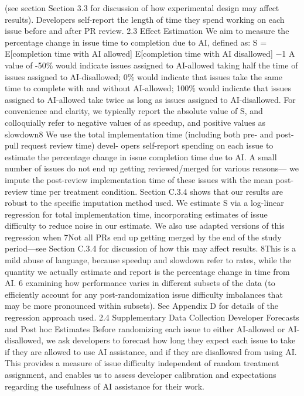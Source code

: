 (see section Section 3.3 for discussion of how experimental design may affect results). Developers
self-report the length of time they spend working on each issue before and after PR review.
2.3
Effect Estimation
We aim to measure the percentage change in issue time to completion due to AI, defined as:
S =
E[completion time with AI allowed]
E[completion time with AI disallowed] −1
A value of -50\% would indicate issues assigned to AI-allowed taking half the time of issues assigned
to AI-disallowed; 0\% would indicate that issues take the same time to complete with and without
AI-allowed; 100\% would indicate that issues assigned to AI-allowed take twice as long as issues
assigned to AI-disallowed. For convenience and clarity, we typically report the absolute value of S,
and colloquially refer to negative values of as speedup, and positive values as slowdown8
We use the total implementation time (including both pre- and post-pull request review time) devel-
opers self-report spending on each issue to estimate the percentage change in issue completion time
due to AI. A small number of issues do not end up getting reviewed/merged for various reasons—
we impute the post-review implementation time of these issues with the mean post-review time
per treatment condition. Section C.3.4 shows that our results are robust to the specific imputation
method used.
We estimate S via a log-linear regression for total implementation time, incorporating estimates of
issue difficulty to reduce noise in our estimate. We also use adapted versions of this regression when
7Not all PRs end up getting merged by the end of the study period—see Section C.3.4 for discussion of how
this may affect results.
8This is a mild abuse of language, because speedup and slowdown refer to rates, while the quantity we
actually estimate and report is the percentage change in time from AI.
6
examining how performance varies in different subsets of the data (to efficiently account for any
post-randomization issue difficulty imbalances that may be more pronounced within subsets). See
Appendix D for details of the regression approach used.
2.4
Supplementary Data Collection
Developer Forecasts and Post hoc Estimates
Before randomizing each issue to either AI-allowed
or AI-disallowed, we ask developers to forecast how long they expect each issue to take if they are
allowed to use AI assistance, and if they are disallowed from using AI. This provides a measure
of issue difficulty independent of random treatment assignment, and enables us to assess developer
calibration and expectations regarding the usefulness of AI assistance for their work.
